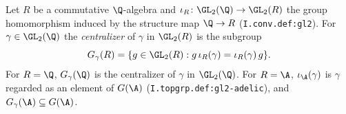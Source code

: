 Let $R$ be a commutative $\Q$-algebra and $\iota_R\colon\GL_2(\Q)\to\GL_2(R)$ the group homomorphism induced by the
structure map $\Q\to R$ (\texttt{I.conv.def:gl2}). For $\gamma\in\GL_2(\Q)$ the \emph{centralizer} of $\gamma$ in $\GL_2(R)$ is the
subgroup
\[
  G_\gamma(R)=\{g\in\GL_2(R):g\,\iota_R(\gamma)=\iota_R(\gamma)\,g\}.
\]
For $R=\Q$, $G_\gamma(\Q)$ is the centralizer of $\gamma$ in $\GL_2(\Q)$. For $R=\A$, $\iota_\A(\gamma)$ is $\gamma$ regarded as an
element of $G(\A)$ (\texttt{I.topgrp.def:gl2-adelic}), and $G_\gamma(\A)\subseteq G(\A)$.
